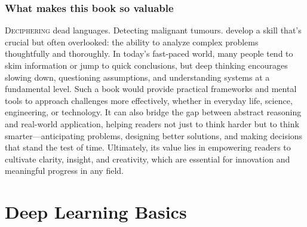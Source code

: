 \documentclass{book}
\begin{document}
\subsection{What makes this book so valuable}
\lettrine{D}{eciphering} dead languages. Detecting malignant tumours. develop a skill that’s crucial but often overlooked: the ability to analyze complex problems thoughtfully and thoroughly. In today’s fast-paced world, many people tend to skim information or jump to quick conclusions, but deep thinking encourages slowing down, questioning assumptions, and understanding systems at a fundamental level. Such a book would provide practical frameworks and mental tools to approach challenges more effectively, whether in everyday life, science, engineering, or technology. It can also bridge the gap between abstract reasoning and real-world application, helping readers not just to think harder but to think smarter—anticipating problems, designing better solutions, and making decisions that stand the test of time. Ultimately, its value lies in empowering readers to cultivate clarity, insight, and creativity, which are essential for innovation and meaningful progress in any field.

\chapter{Deep Learning Basics}
\end{document}
